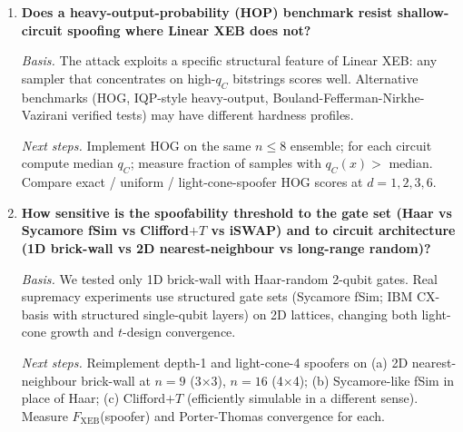 \begin{enumerate}
  \emph{Basis.} The paper is noiseless-classical: it shows
  $F_{\mathrm{XEB}}\gg 0$ is achievable classically without touching
  $q_C$. Sycamore's $F\approx 2.24\cdot 10^{-3}$ was consistent with
  per-gate errors $\sim 0.5\text{--}1\%$. We did not model noise.

  \emph{Next steps.} Add depolarising / amplitude-damping channels
  (density-matrix sim) with $p_2\in\{10^{-3}, 5\cdot 10^{-3}, 10^{-2},
  2\cdot 10^{-2}, 5\cdot 10^{-2}\}$, compare $F_{\mathrm{XEB}}$(noisy
  quantum) vs $F_{\mathrm{XEB}}$(light-cone spoofer) on the same
  circuit at each depth, and locate the crossover.

\item \textbf{Does a heavy-output-probability (HOP) benchmark resist
  shallow-circuit spoofing where Linear XEB does not?}

  \emph{Basis.} The attack exploits a specific structural feature of
  Linear XEB: any sampler that concentrates on high-$q_C$ bitstrings
  scores well. Alternative benchmarks (HOG, IQP-style heavy-output,
  Bouland-Fefferman-Nirkhe-Vazirani verified tests) may have different
  hardness profiles.

  \emph{Next steps.} Implement HOG on the same $n\le 8$ ensemble; for
  each circuit compute median $q_C$; measure fraction of samples with
  $q_C(x)>$ median. Compare exact / uniform / light-cone-spoofer HOG
  scores at $d=1,2,3,6$.

\item \textbf{How sensitive is the spoofability threshold to the gate
  set (Haar vs Sycamore fSim vs Clifford$+T$ vs iSWAP) and to circuit
  architecture (1D brick-wall vs 2D nearest-neighbour vs long-range
  random)?}

  \emph{Basis.} We tested only 1D brick-wall with Haar-random 2-qubit
  gates. Real supremacy experiments use structured gate sets (Sycamore
  fSim; IBM CX-basis with structured single-qubit layers) on 2D
  lattices, changing both light-cone growth and $t$-design convergence.

  \emph{Next steps.} Reimplement depth-1 and light-cone-4 spoofers on
  (a) 2D nearest-neighbour brick-wall at $n=9$ (3$\times$3), $n=16$
  (4$\times$4); (b) Sycamore-like fSim in place of Haar; (c)
  Clifford$+T$ (efficiently simulable in a different sense). Measure
  $F_{\mathrm{XEB}}$(spoofer) and Porter-Thomas convergence for each.

\end{enumerate}
